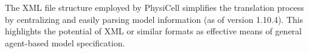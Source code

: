 

The XML file structure employed by PhysiCell simplifies the translation process by centralizing and easily parsing model information (as of version 1.10.4). This highlights the potential of XML or similar formats as effective means of general agent-based model specification.






